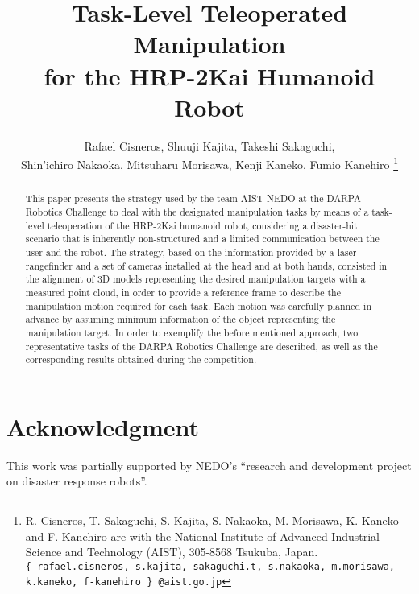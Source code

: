 \documentclass[letterpaper, 10 pt, conference]{ieeeconf}
\begin{document}
	\title{\LARGE \bf Task-Level Teleoperated Manipulation \\ for the HRP-2Kai Humanoid Robot}

	\author{Rafael Cisneros, Shuuji Kajita, Takeshi Sakaguchi, \\
					Shin'ichiro Nakaoka, Mitsuharu Morisawa, Kenji Kaneko, Fumio Kanehiro
	\thanks{R. Cisneros, T. Sakaguchi, S. Kajita, S. Nakaoka, M. Morisawa, K. Kaneko and F. Kanehiro
					are with the National Institute of Advanced Industrial Science and Technology (AIST),
					305-8568 Tsukuba, Japan.
					{\tt\scriptsize \{~rafael.cisneros, s.kajita, sakaguchi.t,
					s.nakaoka, m.morisawa, k.kaneko, f-kanehiro~\} @aist.go.jp}}}
  
	\maketitle

	\thispagestyle{empty}
	\pagestyle{empty}

	\begin{abstract}
		This paper presents the strategy used by the team AIST-NEDO at the DARPA Robotics Challenge to deal
		with the designated manipulation tasks by means of a task-level teleoperation of the HRP-2Kai humanoid robot,
		considering a disaster-hit scenario that is inherently non-structured and a limited communication between the
		user and the robot.
		The strategy, based on the information provided by a laser rangefinder and a set of cameras installed
		at the head and at both hands, consisted in the alignment of 3D models representing the desired manipulation
		targets with a measured point cloud, in order to provide a reference frame to describe the manipulation motion
		required for each task.
		Each motion was carefully planned in advance by assuming minimum information of the object representing the
		manipulation target.
		In order to exemplify the before mentioned approach, two representative tasks of the DARPA Robotics Challenge
		are described, as well as the corresponding results obtained during the competition.
	\end{abstract}

	
	
		
	
	
	
	
	
	
	
	
	
	
	
	\section*{Acknowledgment}
	
		This work was partially supported by NEDO's ``research and development project on disaster response robots''.
	
	
	
	
\end{document}
